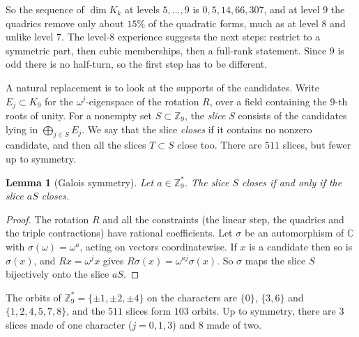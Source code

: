 \documentclass[11pt]{amsart}
\newtheorem{lemma}[theorem]{Lemma}
\theoremstyle{definition}
\theoremstyle{remark}
\theoremstyle{plain}
\numberwithin{equation}{section}
\numberwithin{table}{section}
\newcommand{\C}{\mathbb C}
\newcommand{\Z}{\mathbb Z}
\begin{document}
So the sequence of $\dim K_k$ at levels $5,\dots,9$ is $0,5,14,66,307$, and at level $9$ the quadrics remove only about $15\%$ of the quadratic forms, much as at level $8$ and unlike level $7$. The level-$8$ experience suggests the next steps: restrict to a symmetric part, then cubic memberships, then a full-rank statement. Since $9$ is odd there is no half-turn, so the first step has to be different.

A natural replacement is to look at the supports of the candidates. Write $E_j\subset K_9$ for the $\omega^j$-eigenspace of the rotation $R$, over a field containing the $9$-th roots of unity. For a nonempty set $S\subset\Z_9$, the \emph{slice} $S$ consists of the candidates lying in $\bigoplus_{j\in S}E_j$. We say that the slice \emph{closes} if it contains no nonzero candidate, and then all the slices $T\subset S$ close too. There are $511$ slices, but fewer up to symmetry.

\begin{lemma}[Galois symmetry]\label{lem:galois}
Let $a\in\Z_9^*$. The slice $S$ closes if and only if the slice $aS$ closes.
\end{lemma}

\begin{proof}
The rotation $R$ and all the constraints (the linear step, the quadrics and the triple contractions) have rational coefficients. Let $\sigma$ be an automorphism of $\C$ with $\sigma(\omega)=\omega^a$, acting on vectors coordinatewise. If $x$ is a candidate then so is $\sigma(x)$, and $Rx=\omega^jx$ gives $R\sigma(x)=\omega^{aj}\sigma(x)$. So $\sigma$ maps the slice $S$ bijectively onto the slice $aS$.
\end{proof}

The orbits of $\Z_9^*=\{\pm1,\pm2,\pm4\}$ on the characters are $\{0\}$, $\{3,6\}$ and $\{1,2,4,5,7,8\}$, and the $511$ slices form $103$ orbits. Up to symmetry, there are $3$ slices made of one character ($j=0,1,3$) and $8$ made of two.
\end{document}
